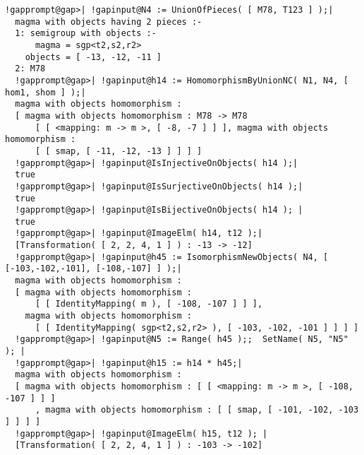 \documentclass[a4paper,11pt]{report}
\begin{document}
{{\begin{Verbatim}[commandchars=!@|,fontsize=\small,frame=single,label=Example]
  !gapprompt@gap>| !gapinput@N4 := UnionOfPieces( [ M78, T123 ] );|
  magma with objects having 2 pieces :-
  1: semigroup with objects :-
      magma = sgp<t2,s2,r2>
    objects = [ -13, -12, -11 ]
  2: M78
  !gapprompt@gap>| !gapinput@h14 := HomomorphismByUnionNC( N1, N4, [ hom1, shom ] );|
  magma with objects homomorphism : 
  [ magma with objects homomorphism : M78 -> M78
      [ [ <mapping: m -> m >, [ -8, -7 ] ] ], magma with objects homomorphism : 
      [ [ smap, [ -11, -12, -13 ] ] ] ]
  !gapprompt@gap>| !gapinput@IsInjectiveOnObjects( h14 );|
  true
  !gapprompt@gap>| !gapinput@IsSurjectiveOnObjects( h14 );|
  true
  !gapprompt@gap>| !gapinput@IsBijectiveOnObjects( h14 ); |
  true
  !gapprompt@gap>| !gapinput@ImageElm( h14, t12 );|
  [Transformation( [ 2, 2, 4, 1 ] ) : -13 -> -12]
  !gapprompt@gap>| !gapinput@h45 := IsomorphismNewObjects( N4, [ [-103,-102,-101], [-108,-107] ] );|
  magma with objects homomorphism : 
  [ magma with objects homomorphism : 
      [ [ IdentityMapping( m ), [ -108, -107 ] ] ], 
    magma with objects homomorphism : 
      [ [ IdentityMapping( sgp<t2,s2,r2> ), [ -103, -102, -101 ] ] ] ]
  !gapprompt@gap>| !gapinput@N5 := Range( h45 );;  SetName( N5, "N5" ); |
  !gapprompt@gap>| !gapinput@h15 := h14 * h45;|
  magma with objects homomorphism : 
  [ magma with objects homomorphism : [ [ <mapping: m -> m >, [ -108, -107 ] ] ]
      , magma with objects homomorphism : [ [ smap, [ -101, -102, -103 ] ] ] ]
  !gapprompt@gap>| !gapinput@ImageElm( h15, t12 ); |
  [Transformation( [ 2, 2, 4, 1 ] ) : -103 -> -102]
  
\end{Verbatim}
 }

 }

          
\end{document}
